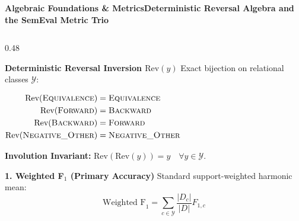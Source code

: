 \documentclass[aspectratio=169,10pt]{beamer}
\begin{document}
\begin{frame}{\textbf{Algebraic Foundations \& Metrics}}{\textbf{Deterministic Reversal Algebra and the SemEval Metric Trio}}
  \begin{columns}[T]
    \begin{column}{0.48\textwidth}
      \begin{block}{\textbf{Deterministic Reversal Inversion $\text{Rev}(y)$}}
        \footnotesize
        Exact bijection on relational classes $\mathcal{Y}$:
        \vskip 1pt
        {\centering\scriptsize\renewcommand{\arraystretch}{0.9}
        $\begin{aligned}
          \text{Rev}(\textsc{Equivalence}) &= \textsc{Equivalence} \\
          \text{Rev}(\textsc{Forward}) &= \textsc{Backward} \\
          \text{Rev}(\textsc{Backward}) &= \textsc{Forward} \\
          \text{Rev}(\textsc{Negative\_Other}) &= \textsc{Negative\_Other}
        \end{aligned}$\par}
        \vskip 2pt
        \textbf{Involution Invariant:} $\text{Rev}(\text{Rev}(y)) = y \quad \forall y \in \mathcal{Y}$.
      \end{block}
      \vspace{0.05cm}
      \begin{block}{\textbf{1. Weighted F$_1$ (Primary Accuracy)}}
        \footnotesize
        Standard support-weighted harmonic mean:
        \vspace{-3pt}
        \[ \text{Weighted F}_1 = \sum_{c \in \mathcal{Y}} \frac{|D_c|}{|D|} F_{1, c} \]
        \vspace{-3pt}
      \end{block}
    \end{column}


\end{columns}
\end{frame}
\end{document}
